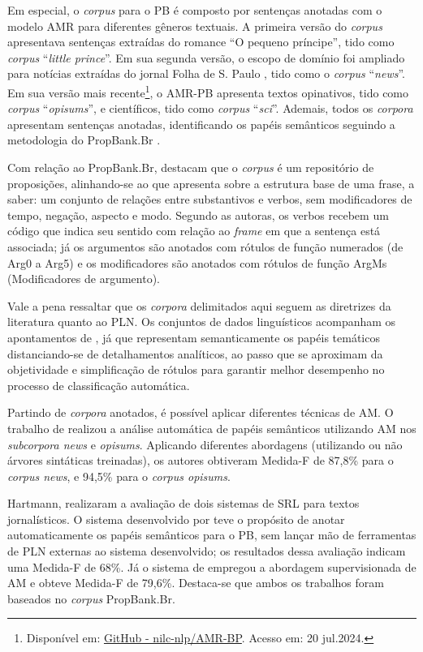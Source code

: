 Em especial, o \emph{corpus} para o PB é composto por sentenças anotadas
com o modelo AMR para diferentes gêneros textuais. A primeira versão do
\emph{corpus} apresentava sentenças extraídas do romance ``O pequeno
príncipe'', tido como \emph{corpus} ``\emph{little prince}''. Em sua
segunda versão, o escopo de domínio foi ampliado para notícias extraídas
do jornal Folha de S. Paulo \cite{duran2012}, tido como o
\emph{corpus} ``\emph{news}''. Em sua versão mais recente\footnote{Disponível
  em: \href{https://github.com/nilc-nlp/AMR-BP}{GitHub -
  nilc-nlp/AMR-BP}. Acesso em: 20 jul.2024.}, o AMR-PB apresenta textos
opinativos, tido como \emph{corpus} ``\emph{opisums}'', e científicos,
tido como \emph{corpus} ``\emph{sci}''. Ademais, todos os \emph{corpora}
apresentam sentenças anotadas, identificando os papéis semânticos
seguindo a metodologia do PropBank.Br \cite{duran2012}.

Com relação ao PropBank.Br, \textcite{duran2012} destacam que o
\emph{corpus} é um repositório de proposições, alinhando-se ao que
\textcite{fillmore1968} apresenta sobre a estrutura base de uma frase, a saber:
um conjunto de relações entre substantivos e verbos, sem modificadores
de tempo, negação, aspecto e modo. Segundo as autoras, os verbos recebem
um código que indica seu sentido com relação ao \emph{frame} em que a
sentença está associada; já os argumentos são anotados com rótulos de
função numerados (de Arg0 a Arg5) e os modificadores são anotados com
rótulos de função ArgMs (Modificadores de argumento).

Vale a pena ressaltar que os \emph{corpora} delimitados aqui seguem as
diretrizes da literatura quanto ao PLN. Os conjuntos de dados
linguísticos acompanham os apontamentos de \textcite{gildea2002}, já
que representam semanticamente os papéis temáticos distanciando-se de
detalhamentos analíticos, ao passo que se aproximam da objetividade e
simplificação de rótulos para garantir melhor desempenho no processo de
classificação automática.

Partindo de \emph{corpora} anotados, é possível aplicar diferentes
técnicas de AM. O trabalho de \textcite{hartmann2015} realizou a análise
automática de papéis semânticos utilizando AM nos \emph{subcorpora news}
e \emph{opisums}. Aplicando diferentes abordagens (utilizando ou não
árvores sintáticas treinadas), os autores obtiveram Medida-F de 87,8\%
para o \emph{corpus news}, e 94,5\% para o \emph{corpus opisums}.

Hartmann, \textcite{duran2012} realizaram a avaliação de dois sistemas
de SRL para textos jornalísticos. O sistema desenvolvido por \textcite{fonseca2013} teve o propósito de anotar automaticamente os papéis
semânticos para o PB, sem lançar mão de ferramentas de PLN externas ao
sistema desenvolvido; os resultados dessa avaliação indicam uma Medida-F
de 68\%. Já o sistema de \textcite{alva-manchego2012} empregou a abordagem
supervisionada de AM e obteve Medida-F de 79,6\%. Destaca-se que ambos
os trabalhos foram baseados no \emph{corpus} PropBank.Br.


